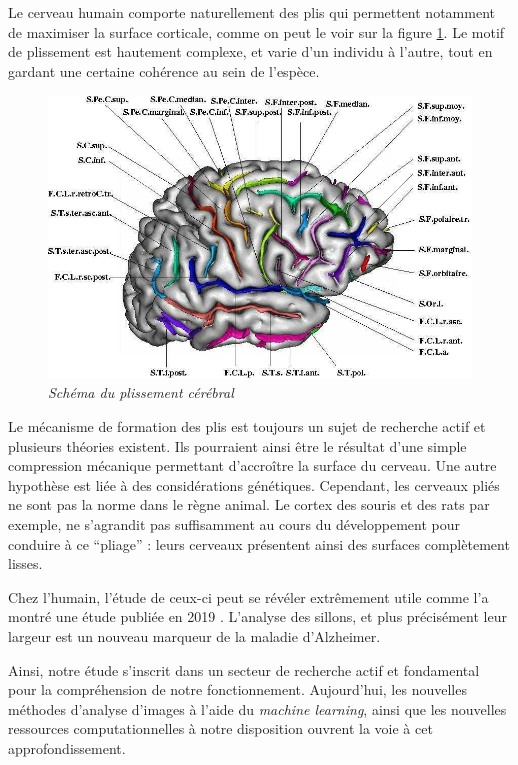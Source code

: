\documentclass[12pt, oneside, a4paper, titlepage]{article}
\begin{document}
\vspace{5mm}

Le cerveau humain comporte naturellement des plis qui permettent notamment de maximiser la surface corticale, comme on peut le voir sur la figure \ref{fig:cerveau}. Le motif de plissement est hautement complexe, et varie d'un individu à l'autre, tout en gardant une certaine cohérence au sein de l'espèce. 

\vspace{5mm} 

\begin{figure}[H]
    \centering
    \includegraphics[width=12cm, height=7.5cm]{vuescerv.jpg}
    \caption{\textit{Schéma du plissement cérébral}}
    \label{fig:cerveau}
\end{figure}

\vspace{5mm}

Le mécanisme de formation des plis est toujours un sujet de recherche actif et plusieurs théories existent. Ils pourraient ainsi être le résultat d’une simple compression mécanique permettant d'accroître la surface du cerveau. Une autre hypothèse est liée à des considérations génétiques. Cependant, les cerveaux pliés ne sont pas la norme dans le règne animal. Le cortex des souris et des rats par exemple, ne s’agrandit pas suffisamment au cours du développement pour conduire à ce “pliage” : leurs cerveaux présentent ainsi des surfaces complètement lisses.

Chez l'humain, l'étude de ceux-ci peut se révéler extrêmement utile comme l'a montré une étude publiée en 2019 \cite{bertoux_sulcal_2019}. L'analyse des sillons, et plus précisément leur largeur est un nouveau marqueur de la maladie d'Alzheimer.

Ainsi, notre étude s'inscrit dans un secteur de recherche actif et fondamental pour la compréhension de notre fonctionnement. Aujourd'hui, les nouvelles méthodes d'analyse d'images à l'aide du \textit{machine learning}, ainsi que les nouvelles ressources computationnelles à notre disposition ouvrent la voie à cet approfondissement. 
\end{document}
